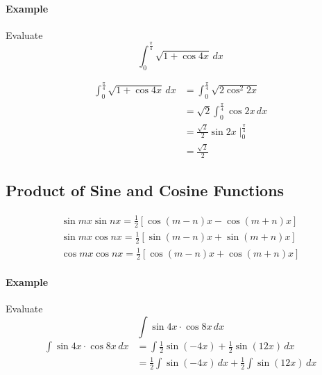 \documentclass[12pt]{article}
\begin{document}
\paragraph{Example} Evaluate
\[
    \int_0^{\frac{\pi}{4}} \sqrt{1 + \cos 4x} \, dx 
\]

\begin{align*} 
    \int_0^{\frac{\pi}{4}} \sqrt{1 + \cos 4x} \, dx &= \int_0^{\frac{\pi}{4}} \sqrt{2 \cos^2 2x}\\
    &= \sqrt{2} \int_0^{\frac{\pi}{4}} \cos 2x \, dx \\
    &= \frac{\sqrt{2}}{2} \sin 2x \mid_0^{\frac{\pi}{4}} \\
    &= \frac{\sqrt{2}}{2}
\end{align*}

\subsection{Product of Sine and Cosine Functions}
\begin{align*} 
    \sin mx \sin nx = \frac{1}{2} [\cos (m - n)x - \cos(m + n)x] \\
    \sin mx \cos nx = \frac{1}{2} [\sin (m - n)x + \sin(m + n)x] \\
    \cos mx \cos nx = \frac{1}{2} [\cos (m - n)x + \cos(m + n)x]
\end{align*}

\paragraph{Example} Evaluate 
\[
    \int \sin 4x \cdot \cos 8x \, dx
\]
\begin{align*} 
    \int \sin 4x \cdot \cos 8x \, dx &= \int \frac{1}{2} \sin ( - 4x) + \frac{1}{2} \sin (12x) \, dx \\
    &= \frac{1}{2} \int \sin( - 4x) \, dx + \frac{1}{2} \int \sin(12x) \, dx
\end{align*}
\end{document}
